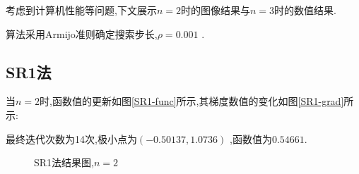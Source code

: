     考虑到计算机性能等问题,下文展示$ n=2 $时的图像结果与$ n=3 $时的数值结果. 
    
    算法采用Armijo准则确定搜索步长,$ \rho = 0.001 $ .
    \subsection{SR1法}
    当$ n=2 $时,函数值的更新如图\ref{SR1-func}所示,其梯度数值的变化如图\ref{SR1-grad}所示:
    \par
    最终迭代次数为14次,极小点为$ (-0.50137,1.0736) $ ,函数值为$ 0.54661. $ 
    \begin{figure}[htbp!]
        \centering
        \caption{SR1法结果图,$ n=2 $ }
    \end{figure}

